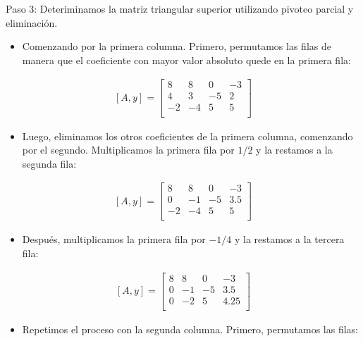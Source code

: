 \documentclass[letterpaper,10pt,english]{jupyterBook}
\begin{document}
\sphinxAtStartPar
Paso 3: Deteriminamos la matriz triangular superior utilizando pivoteo parcial y eliminación.
\begin{itemize}
\item {} 
\sphinxAtStartPar
Comenzando por la primera columna. Primero, permutamos las filas de manera que el coeficiente con mayor valor absoluto quede en la primera fila:

\end{itemize}
\begin{equation*}
\begin{split}
[A, y]  = \begin{bmatrix}
8 & 8 & 0 & -3\\
4 & 3 & -5 & 2\\
-2 & -4 & 5 & 5\\
\end{bmatrix}\end{split}
\end{equation*}\begin{itemize}
\item {} 
\sphinxAtStartPar
Luego, eliminamos los otros coeficientes de la primera columna, comenzando por el segundo. Multiplicamos la primera fila por \(1/2\) y la restamos a la segunda fila:

\end{itemize}
\begin{equation*}
\begin{split}
[A, y]  = \begin{bmatrix}
8 & 8 & 0 & -3\\
0 & -1 & -5 & 3.5\\
-2 & -4 & 5 & 5\\
\end{bmatrix}\end{split}
\end{equation*}\begin{itemize}
\item {} 
\sphinxAtStartPar
Después, multiplicamos la primera fila por \(- 1/4\) y la restamos a la tercera fila:

\end{itemize}
\begin{equation*}
\begin{split}
[A, y]  = \begin{bmatrix}
8 & 8 & 0 & -3\\
0 & -1 & -5 & 3.5\\
0 & -2 & 5 & 4.25\\
\end{bmatrix}\end{split}
\end{equation*}\begin{itemize}
\item {} 
\sphinxAtStartPar
Repetimos el proceso con la segunda columna. Primero, permutamos las filas:

\end{itemize}
\end{document}
